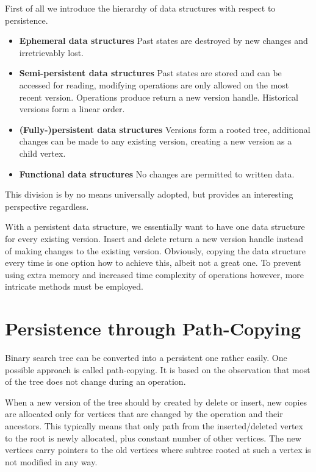 First of all we introduce the hierarchy of data structures with respect to persistence.

\begin{itemize}
\item {\bfseries Ephemeral data structures} Past states are destroyed by new changes and irretrievably lost.
\item {\bfseries Semi-persistent data structures} Past states are stored and can be accessed for reading, modifying operations are only allowed on the most recent version. Operations produce return a new version handle. Historical versions form a linear order.
\item {\bfseries (Fully-)persistent data structures} Versions form a rooted tree, additional changes can be made to any existing version, creating a new version as a child vertex.
\item {\bfseries Functional data structures} No changes are permitted to written data.
\end{itemize}

This division is by no means universally adopted, but provides an interesting perspective regardless.

With a persistent data structure, we essentially want to have one data structure for every existing version. Insert and delete return a new version handle instead of making changes to the existing version. Obviously, copying the data structure every time is one option how to achieve this, albeit not a great one. To prevent using extra memory and increased time complexity of operations however, more intricate methods must be employed.
\section{Persistence through Path-Copying}

Binary search tree can be converted into a persistent one rather easily.
One possible approach is called path-copying. It is based on the observation that most of the tree does not change during an operation.

When a new version of the tree should by created by delete or insert, new copies are allocated only for vertices that are changed by the operation and their ancestors. This typically means that only path from the inserted/deleted vertex to the root is newly allocated, plus constant number of other vertices. The new vertices carry pointers to the old vertices where subtree rooted at such a vertex is not modified in any way.

